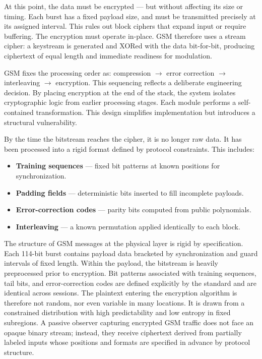 At this point, the data must be encrypted — but without affecting its size or timing. Each burst has a fixed payload size, and must be transmitted precisely at its assigned interval. This rules out block ciphers that expand input or require buffering. The encryption must operate in-place. GSM therefore uses a stream cipher: a keystream is generated and XORed with the data bit-for-bit, producing ciphertext of equal length and immediate readiness for modulation.

GSM fixes the processing order as: compression $\rightarrow$ error correction $\rightarrow$ interleaving $\rightarrow$ encryption. This sequencing reflects a deliberate engineering decision. By placing encryption at the end of the stack, the system isolates cryptographic logic from earlier processing stages. Each module performs a self-contained transformation. This design simplifies implementation but introduces a structural vulnerability.


By the time the bitstream reaches the cipher, it is no longer raw data. It has been processed into a rigid format defined by protocol constraints. This includes:

\begin{itemize}
  \item \textbf{Training sequences} — fixed bit patterns at known positions for synchronization.
  \item \textbf{Padding fields} — deterministic bits inserted to fill incomplete payloads.
  \item \textbf{Error-correction codes} — parity bits computed from public polynomials.
  \item \textbf{Interleaving} — a known permutation applied identically to each block.
\end{itemize}

The structure of GSM messages at the physical layer is rigid by specification. Each 114-bit burst contains payload data bracketed by synchronization and guard intervals of fixed length. Within the payload, the bitstream is heavily preprocessed prior to encryption. Bit patterns associated with training sequences, tail bits, and error-correction codes are defined explicitly by the standard and are identical across sessions. The plaintext entering the encryption algorithm is therefore not random, nor even variable in many locations. It is drawn from a constrained distribution with high predictability and low entropy in fixed subregions. A passive observer capturing encrypted GSM traffic does not face an opaque binary stream; instead, they receive ciphertext derived from partially labeled inputs whose positions and formats are specified in advance by protocol structure.

